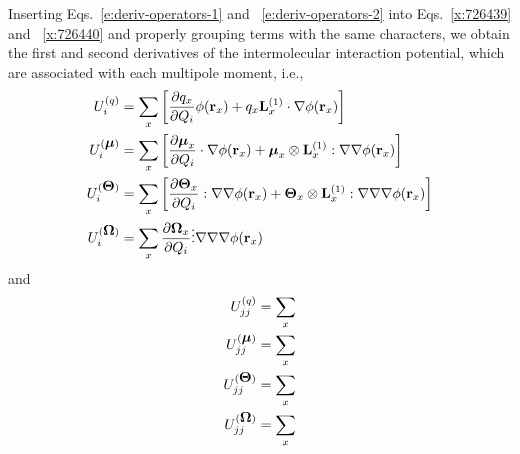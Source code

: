 \documentclass[a4paper,titlepage,twoside,fleqn,12pt]{book}
\newcommand{\BM}[1]{\ensuremath{\mbox{\boldmath${#1}$}}}
\newcommand{\fderiv}[2]{\ensuremath{
\frac{\partial #1}{\partial #2}}}
\begin{document}
\begin{refsection}
Inserting Eqs.~\eqref{e:deriv-operators-1} and ~\eqref{e:deriv-operators-2}
into Eqs.~\eqref{x:726439} and ~\eqref{x:726440} and properly 
grouping terms with the same characters, we obtain
the first and second derivatives of the intermolecular interaction
potential, which are associated with each multipole moment, i.e.,
%
\begin{subequations}  \label{e:f-terms}
\begin{align}
 U_i^{(q)}          &= \sum_x 
  \left[ \fderiv{q_x}{Q_i} \phi({\bf r}_x) 
 + q_x {\bf L}_x^{(1)} \cdot \nabla \phi({\bf r}_x) \right]       
                                                                \label{e:f-terms-1} \\
 U_i^{(\BM\mu)}     &= \sum_x  
  \left[ \fderiv{{\BM \mu}_x}{Q_i} \cdot \nabla\phi({\bf r}_x) 
 + {\BM \mu}_x \otimes {\bf L}_x^{(1)} : \nabla\nabla \phi({\bf r}_x) \right]     
                                                                \label{e:f-terms-2} \\
 U_i^{(\BM\Theta)}  &= \sum_x  
  \left[ \fderiv{{\BM \Theta}_x}{Q_i} : \nabla\nabla\phi({\bf r}_x) 
 + {\BM \Theta}_x \otimes {\bf L}_x^{(1)} : \nabla\nabla\nabla \phi({\bf r}_x) \right]      
                                                                \label{e:f-terms-3} \\
 U_i^{(\BM\Omega)}  &= \sum_x      
  \fderiv{{\BM \Omega}_x}{Q_i} \vdots \nabla\nabla\nabla\phi({\bf r}_x)  
                                                                \label{e:f-terms-4} 
\end{align}
\end{subequations}
%
and
%
\begin{subequations}  \label{e:k-terms}
\begin{align}
 U_{jj}^{(q)}          &= \sum_x        \label{e:k-terms-1} \\
 U_{jj}^{(\BM\mu)}     &= \sum_x        \label{e:k-terms-2} \\
 U_{jj}^{(\BM\Theta)}  &= \sum_x        \label{e:k-terms-3} \\
 U_{jj}^{(\BM\Omega)}  &= \sum_x        \label{e:k-terms-4} \\
\end{align}
\end{subequations}
%



\printbibliography[heading=subbibintoc,title={References}]
\end{refsection}
\end{document}

